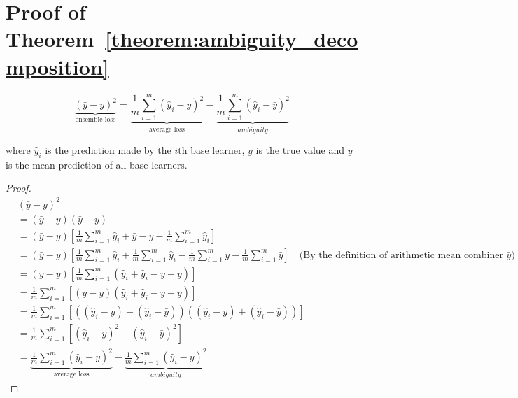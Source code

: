 \documentclass{article}
\begin{document}
\section{Proof of Theorem~\ref{theorem:ambiguity_decomposition}}
\label{appendix:ambiguity_decomposition}
\[
\underbrace{(\bar{y} - y)^2}_{\text{ensemble loss}} = \underbrace{\frac{1}{m} \sum_{i=1}^{m} (\hat{y}_i - y)^2}_{\text{average loss}} - \underbrace{\frac{1}{m} \sum_{i=1}^{m} (\hat{y}_i - \bar{y})^2}_{ambiguity}
\]
\begin{center}
    \begin{minipage}{0.8\linewidth}
        \small
        where $\hat{y}_i$ is the prediction made by the $i$th base learner, $y$ is the true value and $\bar{y}$ is the mean prediction of all base learners. 
    \end{minipage}
    \begin{proof}
        \begin{align*}
            &(\bar{y} - y)^2
            \\
            &= (\bar{y} - y)(\bar{y} - y)
            \\
            &= (\bar{y} - y)\left[\frac{1}{m} \sum_{i=1}^{m} \hat{y}_i + \bar{y} - y - \frac{1}{m} \sum_{i=1}^{m} \hat{y}_i\right]
            \\
            &= (\bar{y} - y)\left[\frac{1}{m} \sum_{i=1}^{m} \hat{y}_i + \frac{1}{m} \sum_{i=1}^{m} \hat{y}_i - \frac{1}{m} \sum_{i=1}^{m} y - \frac{1}{m} \sum_{i=1}^{m} \bar{y}\right] \quad \text{(By the definition of arithmetic mean combiner }\bar{y}\text{)}
            \\
            &= (\bar{y} - y) \left[\frac{1}{m} \sum_{i=1}^{m} (\hat{y}_i + \hat{y}_i - y - \bar{y})\right]
            \\
            &= \frac{1}{m} \sum_{i=1}^{m} \left[(\bar{y} - y) (\hat{y}_i + \hat{y}_i - y - \bar{y})\right]
            \\
            &= \frac{1}{m} \sum_{i=1}^{m} \left[((\hat{y}_i - y) - (\hat{y}_i - \bar{y})) ((\hat{y}_i - y) + (\hat{y}_i - \bar{y}))\right]
            \\
            &= \frac{1}{m} \sum_{i=1}^{m} \left[(\hat{y}_i - y)^2 - (\hat{y}_i - \bar{y})^2\right]
            \\
            &= \underbrace{\frac{1}{m} \sum_{i=1}^{m} (\hat{y}_i - y)^2}_{\text{average loss}} - \underbrace{\frac{1}{m} \sum_{i=1}^{m} (\hat{y}_i - \bar{y})^2}_{ambiguity}
        \end{align*}
    \end{proof}
\end{center}
\end{document}
